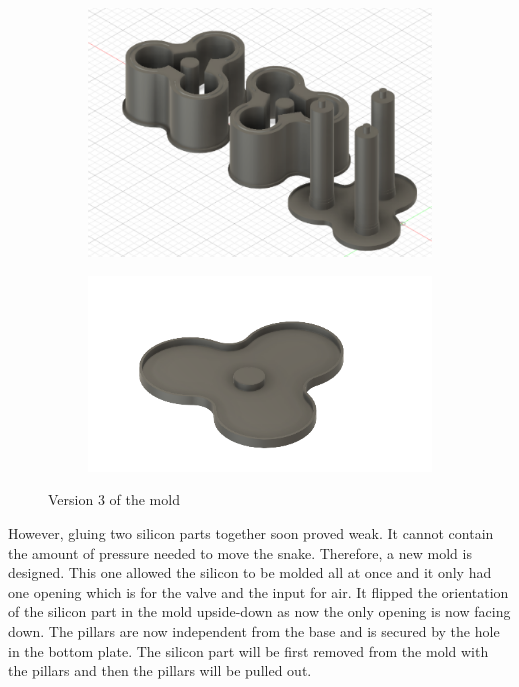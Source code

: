 \documentclass[twoside]{article}
\begin{document}
\begin{figure} [H]
\centering
\begin{subfigure}[b]{0.5\linewidth}
		\centering
		\includegraphics[width=\textwidth]{mold_v3}
	\end{subfigure}%
	\begin{subfigure}[b]{0.5\linewidth}
		\centering		
		\includegraphics[width=\textwidth]{sealing_v3}
	\end{subfigure}
\caption{Version 3 of the mold}
\end{figure}

However, gluing two silicon parts together soon proved weak. It cannot contain the amount of pressure needed to move the snake. Therefore, a new mold is designed. This one allowed the silicon to be molded all at once and it only had one opening which is for the valve and the input for air. It flipped the orientation of the silicon part in the mold upside-down as now the only opening is now facing down. The pillars are now independent from the base and is secured by the hole in the bottom plate. The silicon part will be first removed from the mold with the pillars and then the pillars will be pulled out.
\end{document}

